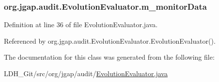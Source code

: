 \hypertarget{classorg_1_1jgap_1_1audit_1_1_evolution_evaluator_a5fabe529afcc7272b37aa940c9339817}{
\subsubsection[{m\-\_\-monitor\-Data}]{ org.\-jgap.\-audit.\-Evolution\-Evaluator.\-m\-\_\-monitor\-Data\hspace{0.3cm}{\ttfamily [private]}}}\label{classorg_1_1jgap_1_1audit_1_1_evolution_evaluator_a5fabe529afcc7272b37aa940c9339817}


Definition at line 36 of file Evolution\-Evaluator.\-java.



Referenced by org.\-jgap.\-audit.\-Evolution\-Evaluator.\-Evolution\-Evaluator().



The documentation for this class was generated from the following file\-:\begin{DoxyCompactItemize}
\item 
L\-D\-H\-\_\-\-Git/src/org/jgap/audit/\hyperlink{_evolution_evaluator_8java}{Evolution\-Evaluator.\-java}\end{DoxyCompactItemize}
